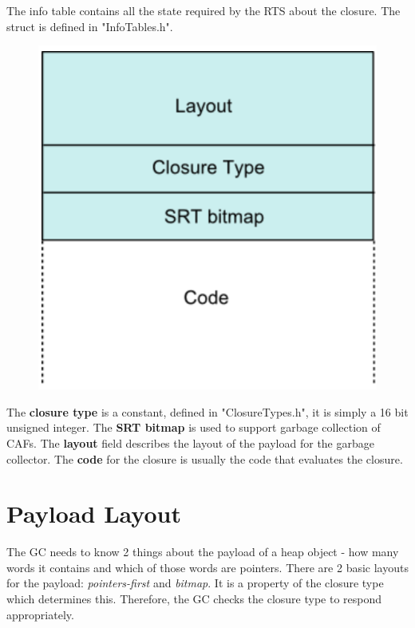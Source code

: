 \documentclass[a4paper,11pt]{article}
\begin{document}
The info table contains all the state required by the RTS about the closure. The struct is defined in "InfoTables.h".

\begin{figure}[H]
    \centering
    \includegraphics{GHC RTS Notes/Storage/images/infotable.png}
    \caption{}
    \label{fig:info_table}
\end{figure}

The \textbf{closure type} is a constant, defined in "ClosureTypes.h", it is simply a 16 bit unsigned integer. The \textbf{SRT bitmap} is used to support garbage collection of CAFs. The \textbf{layout} field describes the layout of the payload for the garbage collector. The \textbf{code} for the closure is usually the code that evaluates the closure.

\section{Payload Layout}

The GC needs to know 2 things about the payload of a heap object - how many words it contains and which of those words are pointers. There are 2 basic layouts for the payload: \textit{pointers-first} and \textit{bitmap}. It is a property of the closure type which determines this. Therefore, the GC checks the closure type to respond appropriately.
\end{document}
